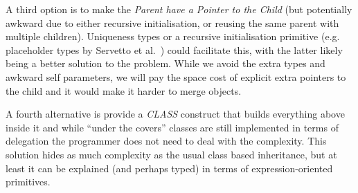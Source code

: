 \documentclass[preprint,10pt]{sigplanconf}
\begin{document}
A third option is to make the \textit{Parent have a Pointer to the Child} (but potentially awkward due to either recursive initialisation, or reusing the same parent with multiple children). Uniqueness types or a recursive initialisation primitive (e.g. placeholder types by Servetto et al.~\cite{servetto:2013:billion}) could facilitate this, with the latter likely being a better solution to the problem. While we avoid the extra types and awkward self parameters, we will pay the space cost of explicit extra pointers to the child and it would make it harder to merge objects.

A fourth alternative is provide a \textit{CLASS} construct that builds everything above inside it and while ``under the covers'' classes are still implemented in terms of delegation the programmer does not need to deal with the complexity. This solution hides as much complexity as the usual class based inheritance, but at least it can be explained (and perhaps typed) in terms of expression-oriented primitives.

\end{document}
